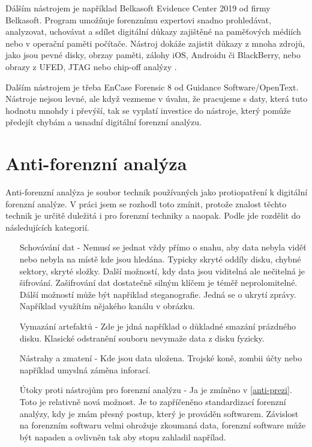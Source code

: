\documentclass[thesis=B,czech]{FITthesis}[2012/06/26]
\begin{document}
Dálším nástrojem je například Belkasoft Evidence Center 2019 od firmy Belkasoft. Program umožňuje forenznímu expertovi snadno prohledávat, analyzovat, uchovávat a sdílet digitální důkazy zajištěné na paměťových médiích nebo v operační paměti počítače. Nástroj dokáže zajistit důkazy z mnoha zdrojů, jako jsou pevné disky, obrzay paměti, zálohy iOS, Androidu či BlackBerry, nebo obrazy z UFED, JTAG nebo chip-off analýzy \cite{for_soft}.

Dalším nástrojem je třeba EnCase Forensic 8 od Guidance Software/OpenText. Nástroje nejsou levné, ale když vezmeme v úvahu, že pracujeme s daty, která tuto hodnotu mnohdy i převýší, tak se vyplatí investice do nástroje, který pomůže předejít chybám a usnadní digitální forenzní analýzu.

\chapter{Anti-forenzní analýza}

Anti-forenzní analýza je soubor technik používaných jako protiopatření k digitální forenzní analýze. V práci jsem se rozhodl toto zmínit, protože znalost těchto technik je určitě duležitá i pro forenzní techniky a naopak. Podle \cite{anti-prezi} jde rozdělit do následujících kategorií.

\begin{itemize}

\item[Schovávání dat] - Nemusí se jednat vždy přímo o snahu, aby data nebyla viděť nebo nebyla na místě kde jsou hledána. Typicky skryté oddíly disku, chybné sektory, skryté složky. Další možností, kdy data jsou viditelná ale nečitelná je šifrování. Zašifrování dat dostatečně silným klíčem je téměř neprolomitelné. Dálší možností může být napřiklad steganografie. Jedná se o ukrytí zprávy. Například využítím nějakého kanálu v obrázku.
\item[Vymazání artefaktů] - Zde je jdná například o důkladné smazání prázdného disku. Klasické odstranění souboru nevymaže data z disku fyzicky. 
\item[Nástrahy a zmatení] - Kde jsou data uložena. Trojské koně, zombii účty nebo například umyslná záměna inforací. 
\item[Útoky proti nástrojům pro forenzní analýzu] - Ja je zmíněno v \ref{anti-prezi}. Toto je relativně nová možnost. Je to zapříčeněno standardizací forenzní analýzy, kdy je znám přesný postup, který je prováděn softwarem. Závislost na forenzním softwaru velmi ohrožuje zkoumaná data, forenzní software může být napaden a ovlivněn tak aby stopu zahladil napřílad. 

\end{itemize}
\end{document}
